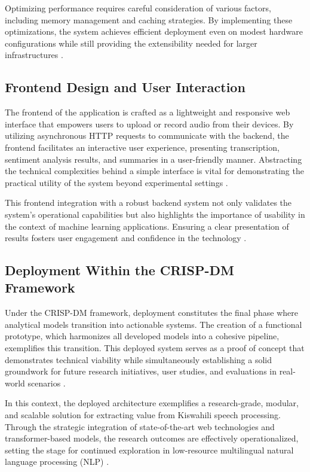 Optimizing performance requires careful consideration of various factors, including memory management and caching strategies. By implementing these optimizations, the system achieves efficient deployment even on modest hardware configurations while still providing the extensibility needed for larger infrastructures \cite{Hazarika2020SurveyOM}.

\subsection{Frontend Design and User Interaction}
The frontend of the application is crafted as a lightweight and responsive web interface that empowers users to upload or record audio from their devices. By utilizing asynchronous HTTP requests to communicate with the backend, the frontend facilitates an interactive user experience, presenting transcription, sentiment analysis results, and summaries in a user-friendly manner. Abstracting the technical complexities behind a simple interface is vital for demonstrating the practical utility of the system beyond experimental settings \cite{10.25236/ajets.2023.061118}.

This frontend integration with a robust backend system not only validates the system's operational capabilities but also highlights the importance of usability in the context of machine learning applications. Ensuring a clear presentation of results fosters user engagement and confidence in the technology \cite{10.7240/jeps.683952}.

\subsection{Deployment Within the CRISP-DM Framework}
Under the CRISP-DM framework, deployment constitutes the final phase where analytical models transition into actionable systems. The creation of a functional prototype, which harmonizes all developed models into a cohesive pipeline, exemplifies this transition. This deployed system serves as a proof of concept that demonstrates technical viability while simultaneously establishing a solid groundwork for future research initiatives, user studies, and evaluations in real-world scenarios \cite{10.1145/3419111.3421299}.

In this context, the deployed architecture exemplifies a research-grade, modular, and scalable solution for extracting value from Kiswahili speech processing. Through the strategic integration of state-of-the-art web technologies and transformer-based models, the research outcomes are effectively operationalized, setting the stage for continued exploration in low-resource multilingual natural language processing (NLP) \cite{10.14778/2735496.2735497}.

